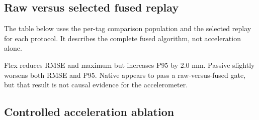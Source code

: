 \documentclass[10pt,a4paper]{article}
\begin{document}
\subsection{Raw versus selected fused replay}
The table below uses the per-tag comparison population and the selected replay
for each protocol. It describes the complete fused algorithm, not acceleration
alone.

\begin{center}\scriptsize{}
\end{center}

Flex reduces RMSE and maximum but increases P95 by 2.0 mm. Passive slightly
worsens both RMSE and P95. Native appears to pass a raw-versus-fused gate, but
that result is not causal evidence for the accelerometer.

\subsection{Controlled acceleration ablation}
\end{document}
